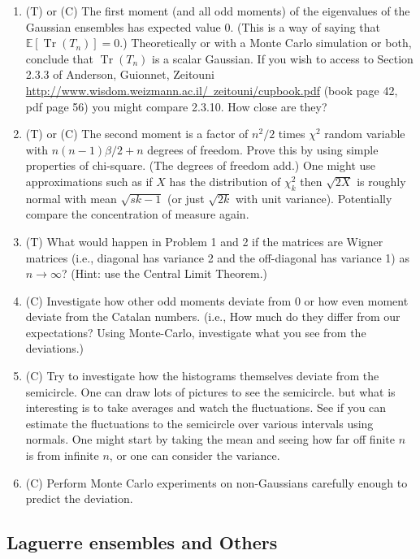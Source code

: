 \documentclass{article}
\DeclareMathOperator{\Tr}{Tr}
\begin{document}
\begin{enumerate}
    \item (T) or (C) The first moment (and all odd moments) of the eigenvalues of the Gaussian ensembles has expected value 0. (This is a way of saying that $\mathbb{E}[\Tr(T_n)]=0$.) Theoretically or with a Monte Carlo simulation or both, conclude that $\Tr(T_n)$ is a scalar Gaussian. If you wish to access to Section 2.3.3 of Anderson, Guionnet, Zeitouni  \href{http://www.wisdom.weizmann.ac.il/~zeitouni/cupbook.pdf}{http://www.wisdom.weizmann.ac.il/~zeitouni/cupbook.pdf} (book page 42, pdf page 56) you might compare 2.3.10. How close are they?
    \item (T) or (C) The second moment is a factor of $n^2/2$ times $\chi^2$ random variable with $n(n-1)\beta/2+n$ degrees of freedom. Prove this by using simple properties of chi-square. (The degrees of freedom add.) One might use approximations such as if $X$ has the distribution of $\chi_k^2$ then $\sqrt{2X}$ is roughly normal with mean $\sqrt{sk-1}$ (or just $\sqrt{2k}$ with unit variance). Potentially compare the concentration of measure again.
    \item (T) What would happen in Problem 1 and 2 if the matrices are Wigner matrices (i.e., diagonal has variance 2 and the off-diagonal has variance 1) as $n\to \infty$? (Hint: use the Central Limit Theorem.)
    \item (C) Investigate how other odd moments deviate from 0 or how even moment deviate from the Catalan numbers. (i.e., How much do they differ from our expectations? Using Monte-Carlo, investigate what you see from the deviations.)
    \item (C) Try to investigate how the histograms themselves deviate from the semicircle. One can draw lots of pictures to see the semicircle. but what is interesting is to take averages and watch the fluctuations. See if you can estimate the fluctuations to the semicircle over various intervals using normals. One might start by taking the mean and seeing how far off finite $n$ is from infinite $n$, or one can consider the variance.
    \item (C) Perform Monte Carlo experiments on non-Gaussians carefully enough to predict the deviation.
\end{enumerate}

\subsection*{Laguerre ensembles and Others}
\end{document}
